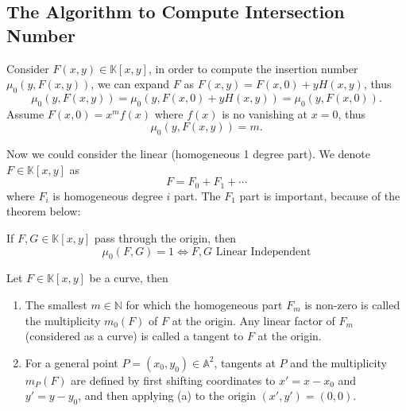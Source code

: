 \documentclass[10pt]{article}
\begin{document}
\subsection{The Algorithm to Compute Intersection Number}

Consider $ F(x,y) \in \mathbb{K}[x,y]$, in order to compute the insertion number $ \mu_{0}(y, F(x,y))$, we can expand $ F$ as $ F(x,y) = F(x,0) + y H(x,y)$, thus
\begin{equation*}
  \mu_{0}(y, F(x,y)) = \mu_{0}(y, F(x,0) + y H(x,y)) = \mu_{0}(y, F(x,0)).
\end{equation*}
Assume $ F(x,0) = x^{m} f(x)$ where $ f(x)$ is no vanishing at $ x=0$, thus
\begin{equation*}
  \mu_{0}(y, F(x,y)) = m.
\end{equation*}

Now we could consider the linear (homogeneous 1 degree part). We denote $ F \in \mathbb{K}[x,y]$ as
\begin{equation*}
  F = F_0 + F_1 +\cdots
\end{equation*}
where $ F_{i}$ is homogeneous degree $ i$ part. The $ F_{1}$ part is important, because of the theorem below:
\begin{theorem}
  If $ F, G \in \mathbb{K}[x,y]$ pass through the origin, then
  \begin{equation*}
    \mu_{0}(F,G) = 1 \Leftrightarrow F, G \text{ Linear Independent}
  \end{equation*}
\end{theorem}

\begin{definition}
  Let $ F \in \mathbb{K}[x,y]$ be a curve, then
  \begin{enumerate}[(1)]
    \item The smallest \( m \in \mathbb{N} \) for which the homogeneous part \( F_m \) is non-zero is called the multiplicity \( m_0(F) \) of \( F \) at the origin. Any linear factor of \( F_m \) (considered as a curve) is called a tangent to \( F \) at the origin.
    \item For a general point \( P = (x_0, y_0) \in \mathbb{A}^2 \), tangents at \( P \) and the multiplicity \( m_P(F) \) are defined by first shifting coordinates to \( x' = x - x_0 \) and \( y' = y - y_0 \), and then applying (a) to the origin \( (x', y') = (0, 0) \).
  \end{enumerate}
\end{definition}
\end{document}
